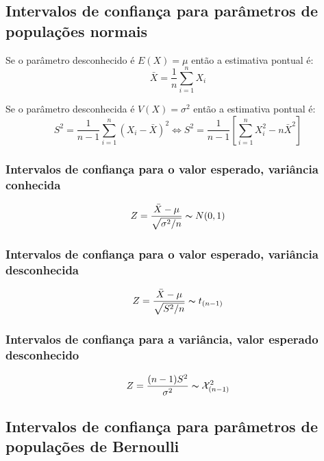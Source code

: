 \documentclass[11pt, a4paper]{article}
\begin{document}
\subsection{Intervalos de confiança para parâmetros de populações normais}

Se o parâmetro desconhecido é $E(X) = \mu$ então a estimativa pontual é:
\begin{equation*}
    \bar{X} = \frac{1}{n} \sum_{i = 1}^{n} X_i
\end{equation*}

Se o parâmetro desconhecida é $V(X) = \sigma^2$ então a estimativa pontual é:
\begin{equation*}
    S^2 = \frac{1}{n - 1} \sum_{i = 1}^{n} (X_i - \bar{X})^2 \Leftrightarrow
    S^2 = \frac{1}{n - 1} \left[\sum_{i = 1}^{n} X_i^2 - n\bar{X}^2\right]
\end{equation*}

\subsubsection*{Intervalos de confiança para o valor esperado, variância conhecida}

\begin{equation*}
    Z = \frac{\bar{X} - \mu}{\sqrt{\sigma^2 / n}} \thicksim N(0, 1)
\end{equation*}

\subsubsection*{Intervalos de confiança para o valor esperado, variância desconhecida}

\begin{equation*}
    Z = \frac{\bar{X} - \mu}{\sqrt{S^2 / n}} \thicksim t_{(n - 1)}
\end{equation*}


\subsubsection*{Intervalos de confiança para a variância, valor esperado desconhecido}

\begin{equation*}
    Z = \frac{(n - 1) S^2}{\sigma^2} \thicksim \mathcal{X}^2_{(n - 1)}
\end{equation*}

\subsection{Intervalos de confiança para parâmetros de populações de Bernoulli}
\end{document}
